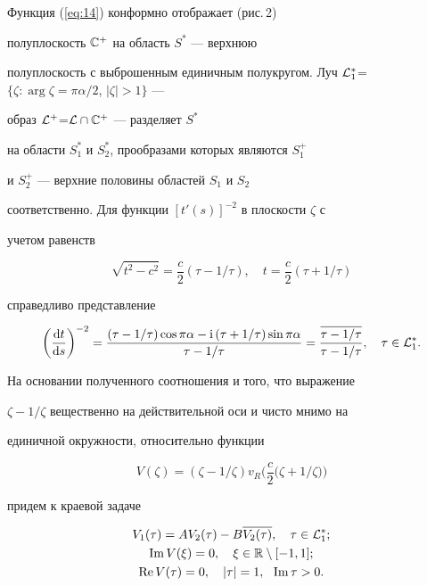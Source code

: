 Функция (\ref{eq:14}) конформно отображает (рис.\,2)


полуплоскость ${\Bbb C}^+$ на область $S^*$ --- верхнюю


полуплоскость с выброшенным единичным полукругом. Луч ${\cal


L}^*_1$=$\{\zeta: \arg\zeta=\pi\alpha/2$, $|\zeta|>1\}$ ---


образ ${\cal L}^+$=${\cal L}\cap{\Bbb C}^+$ --- разделяет $S^*$


на области $S_1^*$ и $S^*_2$, прообразами которых являются $S_1^+$


и $S_2^+$ --- верхние половины областей $S_1$ и $S_2$


соответственно. Для функции $[t'(s)]^{-2}$ в плоскости $\zeta$ с


учетом равенств


$$


\sqrt{t^2- c^2}=\frac{c}{2}\left(\tau-1/\tau\right),


\quad t=\frac{c}{2}\left(\tau+1/\tau\right)


$$


справедливо представление


$$


\left(\frac{\mathrm d t}{\mathrm d s}\right)^{-2}=


\frac{(\tau-1/\tau)\cos\pi\alpha-


\i (\tau+1/\tau)\sin\pi\alpha }{\tau-1/\tau}=


\frac{\overline{\tau-1/\tau}}{\tau-1/\tau},


\quad\tau\in{\cal L}^*_1.


$$


На основании полученного соотношения и того, что выражение


$\zeta-1/\zeta$ вещественно на действительной оси и чисто мнимо на


единичной окружности, относительно функции


\begin{equation} 


V(\zeta)=\left(\zeta-1/\zeta\right)


v_R\bigg(\frac{c}{2}\big(\zeta+1/\zeta\big)\bigg)


\label{eq:16}


\end{equation}


придем к краевой задаче


\begin{gather} 


V_1(\tau)= AV_2(\tau) - B \overline {V_2(\tau)}, \quad 


\tau\in{\cal L}^*_1;\notag \\


\label{eq:17}


\im V(\xi)=0, \quad \xi\in{\Bbb R}\setminus[-1,1];\\


\re V(\tau)=0, \quad |\tau|=1,\ \ \im\tau >0.\notag


\end{gather}


